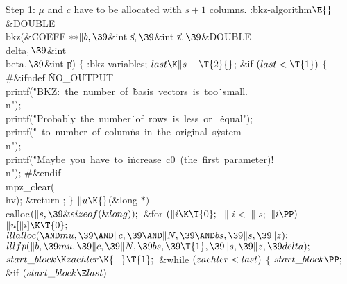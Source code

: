 Step 1:
$\mu$ and $c$ have to be allocated with $s+1$ columns.
\Y\B\4:bkz-algorithm\X${}\E{}$\6
\&{DOUBLE} \\{bkz}(\&{COEFF} ${}{*}{*}\|b,\39{}$\&{int} \|s${},\39{}$\&{int} %
\|z${},\39{}$\&{DOUBLE} \\{delta}${},\39{}$\&{int} \\{beta}${},\39{}$\&{int} %
\|p)\1\1\2\2\6
${}\{{}$\1\6
:bkz variables\X;\6
${}\\{last}\K\|s-\T{2}{}$;\6
\&{if} ${}(\\{last}<\T{1}){}$\5
${}\{{}$\6
\8\#\&{ifndef} \.{NO\_OUTPUT}\1\6
\\{printf}(\.{"BKZ:\ the\ number\ of\ }\)\.{basis\ vectors\ is\ too}\)\.{\
small.\\n"});\6
\\{printf}(\.{"Probably\ the\ number}\)\.{\ of\ rows\ is\ less\ or\ }\)%
\.{equal"});\6
\\{printf}(\.{"\ to\ number\ of\ colum}\)\.{ns\ in\ the\ original\ s}\)\.{ystem%
\\n"});\6
\\{printf}(\.{"Maybe\ you\ have\ to\ i}\)\.{ncrease\ c0\ (the\ firs}\)\.{t\
parameter)!\\n"});\6
\8\#\&{endif}\6
\\{mpz\_clear}(\\{hv});\6
\&{return} ;\6
\4${}\}{}$\2\6
${}\|u\K{}$(\&{long} ${}{*}){}$ \\{calloc}${}(\|s,\39\&{sizeof}(\&{long}));{}$\6
\&{for} ${}(\|i\K\T{0};{}$ ${}\|i<\|s;{}$ ${}\|i\PP){}$\1\5
${}\|u[\|i]\K\T{0};{}$\2\6
${}\\{lllalloc}({\AND}\\{mu},\39{\AND}\|c,\39{\AND}\|N,\39{\AND}\\{bs},\39\|s,%
\39\|z);{}$\6
${}\\{lllfp}(\|b,\39\\{mu},\39\|c,\39\|N,\39\\{bs},\39\T{1},\39\|s,\39\|z,\39%
\\{delta});{}$\6
${}\\{start\_block}\K\\{zaehler}\K{-}\T{1};{}$\6
\&{while} ${}(\\{zaehler}<\\{last}){}$\5
${}\{{}$\1\6
${}\\{start\_block}\PP;{}$\6
\&{if} ${}(\\{start\_block}\E\\{last}){}$\1\5

